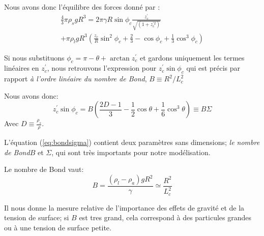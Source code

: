         Nous avons donc l'équilibre des forces donné par :
        \begin{multline}
            \frac{4}{3}\pi\rho_{s}gR^3 =2\pi\gamma R \sin\phi_c \frac{z_c^{'}}{\sqrt{(1+z_c^{'2})}} 
            \\+ \pi\rho_l g R^3 \left(\frac{z_c}{R}\sin^2 \phi_c + \frac{2}{3}-\cos\phi_c+\frac{1}{3}\cos^3 \phi_c\right)
            \label{eq:BalanceOfForces}
        \end{multline}


        Si nous substituons \(\phi_c = \pi - \theta + \arctan z_c^{'}\) et gardons uniquement les termes linéaires en \(z_c^{'}\), nous retrouvons l'expression pour \(z_c^{'}\sin \phi_c\) qui est précis par rapport \textit{à l'ordre linéaire du nombre de Bond}, \(B \equiv R^2/L_c^2\) 

        Nous avons donc:
        \begin{equation}
            z_c^{'}\sin \phi_c = B\left(\frac{2D-1}{3}-\frac{1}{2}\cos \theta + \frac{1}{6} \cos^3 \theta\right) \equiv B\Sigma
            \label{eq:bondsigma}
        \end{equation}
        Avec \(D \equiv \frac{\rho_s}{\rho}\).


        L'équation (\ref{eq:bondsigma}) contient deux paramètres sans dimensions; \textit{le nombre de Bond}$B$ et $\Sigma$, qui sont très importants pour notre modélisation.

        Le nombre de Bond vaut:
        \begin{equation}
            B = \frac{(\rho_l-\rho_{a})gR^2}{\gamma} \simeq \frac{R^2}{L_c^2}
        \end{equation}

        Il nous donne la mesure relative de l'importance des effets de gravité et de la tension de surface; si $B$ est tres grand, cela correspond à des particules grandes ou à une tension de surface petite. 

